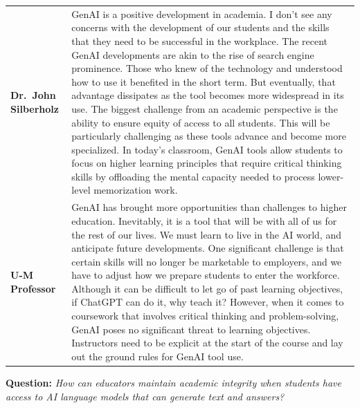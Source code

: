 \documentclass[
]{book}
\begin{document}
\begin{longtable}[]{@{}
  >{\raggedright\arraybackslash}p{}
  >{\raggedright\arraybackslash}p{}@{}}
\textbf{Dr.~John Silberholz} & GenAI is a positive development in academia. I don't see any concerns with the development of our students and the skills that they need to be successful in the workplace. The recent GenAI developments are akin to the rise of search engine prominence. Those who knew of the technology and understood how to use it benefited in the short term. But eventually, that advantage dissipates as the tool becomes more widespread in its use. The biggest challenge from an academic perspective is the ability to ensure equity of access to all students. This will be particularly challenging as these tools advance and become more specialized. In today's classroom, GenAI tools allow students to focus on higher learning principles that require critical thinking skills by offloading the mental capacity needed to process lower-level memorization work. \\
\textbf{U-M Professor} & GenAI has brought more opportunities than challenges to higher education. Inevitably, it is a tool that will be with all of us for the rest of our lives. We must learn to live in the AI world, and anticipate future developments. One significant challenge is that certain skills will no longer be marketable to employers, and we have to adjust how we prepare students to enter the workforce. Although it can be difficult to let go of past learning objectives, if ChatGPT can do it, why teach it? However, when it comes to coursework that involves critical thinking and problem-solving, GenAI poses no significant threat to learning objectives. Instructors need to be explicit at the start of the course and lay out the ground rules for GenAI tool use. \\
\end{longtable}

\textbf{Question:} \emph{How can educators maintain academic integrity when students have access to AI language models that can generate text and answers?}
\end{document}
